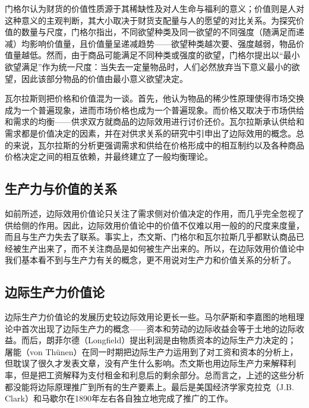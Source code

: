 门格尔认为财货的价值性质源于其稀缺性及对人生命与福利的意义；价值则是人对这种意义的主观判断，其大小取决于财货支配量与人的愿望的对比关系。为探究价值的数量与尺度，门格尔指出，不同欲望种类及同一欲望的不同强度（随满足而递减）均影响价值量，且价值量呈递减趋势——欲望种类越次要、强度越弱，物品价值量越低。然而，由于商品可能满足不同种类或强度的欲望，门格尔提出以“最小欲望满足”作为统一尺度：当失去一定量物品时，人们必然放弃当下意义最小的欲望，因此该部分物品的价值由最小意义欲望决定。\cite[167-172]{YanZhiJieCongBianJiGeMingDaoKaiEnSiGeMing2022}\cite[52-80]{QiaEr*MenGeErGuoMinJingJiXueYuanLi2024}

瓦尔拉斯则把价格和价值混为一谈。首先，他认为物品的稀少性原理使得市场交换成为一个普遍现象，进而市场价格也成为一个普遍现象。而价格又取决于市场供给和需求的均衡——供求双方就商品的边际效用进行讨价还价。瓦尔拉斯承认供给和需求都是价值决定的因素，并在对供求关系的研究中引申出了边际效用的概念。总的来说，瓦尔拉斯的分析更强调需求和供给在价格形成中的相互制约以及各种商品价格决定之间的相互依赖，并最终建立了一般均衡理论。\cite[181-188]{YanZhiJieCongBianJiGeMingDaoKaiEnSiGeMing2022}\cite[139-147]{LaiAng*WaErLaSiChunCuiJingJiXueYaoYi1989}

\subsection{生产力与价值的关系}

如前所述，边际效用价值论只关注了需求侧对价值决定的作用，而几乎完全忽视了供给侧的作用。因此，边际效用价值论中的价值不仅难以用一般的的尺度来度量，而且与生产力失去了联系。事实上，杰文斯、门格尔和瓦尔拉斯几乎都默认商品已经被生产出来了，而不关注商品是如何被生产出来的。所以，在边际效用价值论中我们基本看不到与生产力有关的概念，更不用说对生产力和价值关系的分析了。

\subsection{边际生产力价值论}

边际生产力价值论的发展历史较边际效用论更长一些。马尔萨斯和李嘉图的地租理论中首次出现了边际生产力的概念——资本和劳动的边际收益会等于土地的边际收益。而后，朗菲尔德（Longfield）提出利润是由物质资本的边际生产力决定的；屠能（von Thünen）在同一时期把边际生产力运用到了对工资和资本的分析上，但耽误了很久才发表文章，没有产生什么影响。杰文斯也用边际生产力来解释利率，但是把工资解释为支付租金和利息后的剩余部分。总而言之，上述的这些分析都没能将边际原理推广到所有的生产要素上。最后是美国经济学家克拉克（J.B. Clark）和马歇尔在1890年左右各自独立地完成了推广的工作。\cite[8222-8224]{macmillanpublishersltdNewPalgraveDictionary2018}

